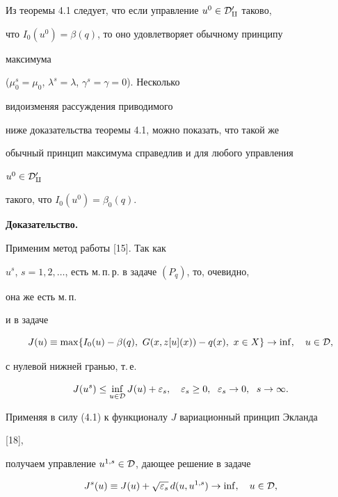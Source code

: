  


\begin{notes} 


Из теоремы 4.1 следует, что если управление $u^0\in\cal D^0_q$ таково, 


что $I_0(u^0)=\beta(q)$, то оно удовлетворяет обычному принципу 


максимума 


($\mu^s_0=\mu_0$, $\lambda^s=\lambda$, $\gamma^s=\gamma=0$). Несколько 


видоизменяя рассуждения приводимого 


ниже доказательства теоремы 4.1, можно показать, что такой же 


обычный принцип максимума справедлив и для любого управления 


$u^0\in\cal D^0_q$ 


такого, что $I_0(u^0)=\beta_0(q)$. 


\end{notes} 


 


{\bf Доказательство.} 


Применим метод работы [15]. Так как 


$u^s$, $s=1,2,\dotsc$, есть м.\,п.\,р. в задаче $(P_q)$, то, очевидно, 


она же есть м.\,п. 


и в задаче 


$$ 


J(u)\equiv\max\{I_0(u)-\beta(q),\ G(x,z[u](x))-q(x), 


\ x\in X\}\to\inf,\quad u\in\cal D, 


$$ 


с нулевой нижней гранью, т.\,е. 


\begin{equation} 


J(u^s)\le\inf_{u\in\cal D}J(u)+\varepsilon_s,\quad 


\varepsilon_s\ge0,\ \; \varepsilon_s\to0,\ \; s\to\infty. 


\end{equation} 


Применяя в силу (4.1) к функционалу $J$ вариационный принцип Экланда 


[18], 


получаем управление $u^{1,s}\in\cal D$, дающее решение в задаче 


\begin{equation} 


J^s(u)\equiv J(u)+\sqrt{\varepsilon_s}\,d(u,u^{1,s})\to\inf, 


\quad u\in\cal D, 


\end{equation} 


